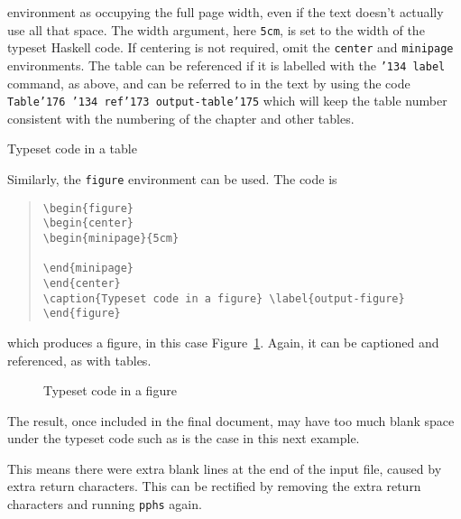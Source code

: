environment as occupying the full page width, even if the text doesn't actually
use all that space.  The width argument, here {\tt 5cm}, is set to the width of the typeset
Haskell code.  If centering is not required, omit the {\tt center} and
{\tt minipage} environments.
The table can be referenced if it is labelled with the {\tt \char'134 label}
command, as above, and can be referred to in the text by using the code
{\tt Table\char'176 \char'134 ref\char'173 output-table\char'175} which will
keep the table number consistent with the numbering of the chapter and other tables.
\begin{table}
\begin{center}
\begin{minipage}{5cm}

\end{minipage}
\end{center}
\caption{Typeset code in a table} \label{simple-table}
\end{table}
Similarly, the {\tt figure} environment can be used.  The code is
\begin{quote}
\begin{verbatim}
\begin{figure}
\begin{center}
\begin{minipage}{5cm}

\end{minipage}
\end{center}
\caption{Typeset code in a figure} \label{output-figure}
\end{figure}
\end{verbatim}
\end{quote}
which produces a figure, in this case Figure~\ref{simple-figure}.
Again, it can be captioned and referenced, as with tables.
\begin{figure}
\begin{center}
\begin{minipage}{5cm}

\end{minipage}
\end{center}
\caption{Typeset code in a figure} \label{simple-figure}
\end{figure}

The result, once included in the final document, may have too
much blank space under the typeset code such as is the case in
this next example.
\begin{quote}

\end{quote}
This means there were extra blank lines at the end of the input file, caused
by extra return characters.  This can be
rectified by removing the extra return characters and running {\tt pphs} again.

